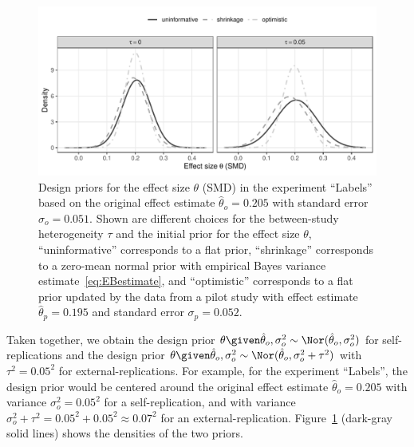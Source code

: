\begin{figure}[!ht]
\begin{knitrout}
\color{fgcolor}
\includegraphics[width=\textwidth]{images/paper3/example-design-prior-1}
\end{knitrout}

\caption{Design priors for the effect size $\theta$ (SMD) in the experiment
  ``Labels'' based on the original effect estimate
  $\hat{\theta}_{o} = 0.205$ with standard error
  $\sigma_{o} = 0.051$. Shown are different
  choices for the between-study heterogeneity $\tau$ and the initial prior for
  the effect size $\theta$, ``uninformative'' corresponds to a flat prior,
  ``shrinkage'' corresponds to a zero-mean normal prior with empirical Bayes
  variance estimate~\eqref{eq:EBestimate}, and ``optimistic'' corresponds to a
  flat prior updated by the data from a pilot study with effect estimate
  $\hat{\theta}_{p} = 0.195$ and standard error
  $\sigma_{p} = 0.052$.}
\label{fig:dpexample}
\end{figure}



Taken together, we obtain the design prior
$\theta \given \hat{\theta}_{o}, \sigma^{2}_{o} \sim \Nor(\hat{\theta}_{o}, \sigma^{2}_{o})$
for self-replications and the design prior
$\theta \given \hat{\theta}_{o}, \sigma^{2}_{o} \sim \Nor(\hat{\theta}_{o}, \sigma^{2}_{o} + \tau^{2})$
with $\tau^{2} = 0.05^{2}$ for external-replications. For
example, for the experiment ``Labels'', the design prior would be
centered around the original effect estimate
$\hat{\theta}_{o} = 0.205$ with variance
$\sigma^{2}_{o} = 0.05^{2}$ for a
self-replication, and with variance
$\sigma^{2}_{o} + \tau^{2} = 0.05^{2} + 0.05^{2} \approx 0.07^{2}$
for an external-replication. Figure~\ref{fig:dpexample} (dark-gray solid lines)
shows the densities of the two priors.

